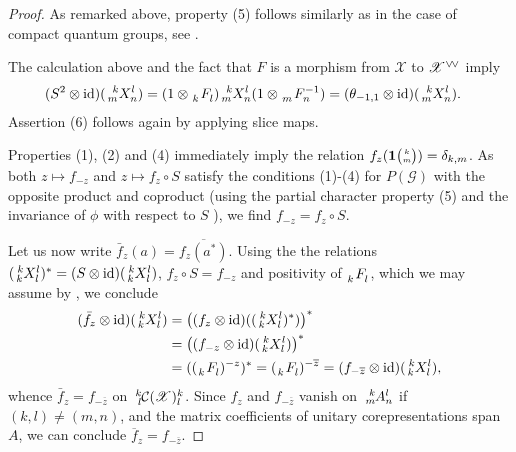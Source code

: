 \begin{proof}
    As remarked above, property (5) follows similarly as in the case of compact quantum groups, see \cite[Theorem 5.6]{W1}. 

  The calculation above and the fact that $F$ is a morphism from $\mathscr{X}$ to $\mathscr{X}^{\vee}{}\!^{\vee}$ imply
    \begin{align*}
      (S^{2} \otimes \id)(\Gr{X}{k}{l}{m}{n}) &= (1
      \otimes\Grd{F}{k}{l})
      \Gr{X}{k}{l}{m}{n}(1 \otimes \Gr{F}{}{-1}{m}{n})
      =(\theta_{-1,1}  \otimes \id)(\Gr{X}{k}{l}{m}{n}).
    \end{align*}
     Assertion (6) follows again by applying slice maps.
    
     Properties (1), (2) and (4)   immediately imply the relation  $f_{z}(\mathbf{1}{\tiny {\begin{pmatrix} k\\m\end{pmatrix}}})=\delta_{k,m}$. As both $z\mapsto f_{-z}$ and $z \mapsto f_{z} \circ S$ satisfy the conditions (1)-(4) for $P(\mathscr{G})$ with the opposite product and coproduct (using the partial character property (5) and the invariance of $\phi$ with respect to $S$ \cite[Corollary 2.20]{DCT1}), we find $f_{-z} = f_{z} \circ S$.

Let us now write $\bar{f}_z(a) = \overline{f_z(a^*)}$. Using the       the relations $
      (\Gr{X}{k}{l}{k}{l})^{*}= (S \otimes \id)(\Gr{X}{k}{l}{k}{l})$, $f_{z} \circ S = f_{-z}$ and positivity of $\Grd{F}{k}{l}$, which we may assume by \cite[Proposition 2.29]{DCT1},        we conclude
      \begin{align*}
       (\bar{f}_z \otimes
        \id)(\Gr{X}{k}{l}{k}{l})
&=       \left((f_{z} \otimes
       \id)((\Gr{X}{k}{l}{k}{l})^{*})\right)^{*} \\
& = \left((f_{-z} \otimes \id)(\Gr{X}{k}{l}{k}{l})\right)^{*} 
\\ &  =
 ((\Grd{F}{k}{l})^{-z})^{*} 
 =       (\Grd{F}{k}{l})^{-\overline{z}} = (f_{-\overline{z}}
 \otimes \id)(\Gr{X}{k}{l}{k}{l}),
      \end{align*}
whence $\bar{f}_z = f_{-\overline{z}}$ on $\Gr{{\cal C}(\mathscr{X})}{k}{k}{l}{l}$. Since $f_{z}$ and $f_{-\overline{z}}$ vanish on $\Gr{A}{k}{l}{m}{n}$ if $(k,l) \neq (m,n)$, and the matrix coefficients of unitary corepresentations span $A$, we can conclude $\overline{f}_{z}=f_{-\overline{z}}$.
\end{proof}
